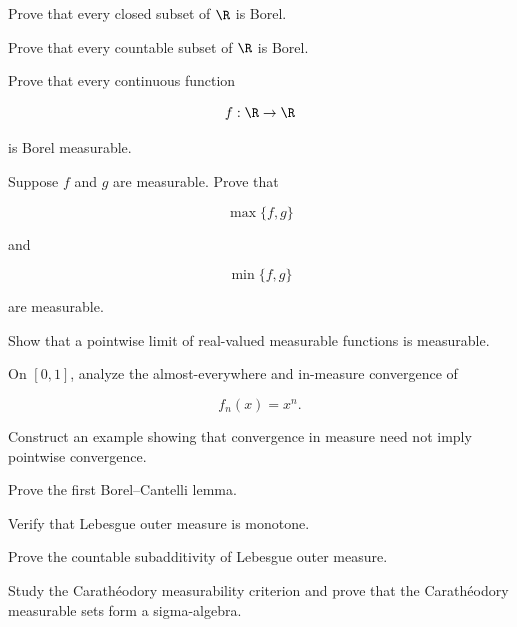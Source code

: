 \begin{exercise}[3]
Prove that every closed subset of \(\R\) is Borel.
\end{exercise}

\begin{exercise}[3]
Prove that every countable subset of \(\R\) is Borel.
\end{exercise}

\begin{exercise}[3]
Prove that every continuous function

\[
f:\R\to\R
\]

is Borel measurable.
\end{exercise}

\begin{exercise}[3]
Suppose \(f\) and \(g\) are measurable. Prove that

\[
\max\{f,g\}
\]

and

\[
\min\{f,g\}
\]

are measurable.
\end{exercise}

\begin{exercise}[3]
Show that a pointwise limit of real-valued measurable functions is
measurable.
\end{exercise}

\begin{exercise}[3]
On \([0,1]\), analyze the almost-everywhere and in-measure convergence of

\[
f_n(x)=x^n.
\]
\end{exercise}

\begin{exercise}[3]
Construct an example showing that convergence in measure need not imply
pointwise convergence.
\end{exercise}

\begin{exercise}[3]
Prove the first Borel--Cantelli lemma.
\end{exercise}

\begin{exercise}[4]
Verify that Lebesgue outer measure is monotone.
\end{exercise}

\begin{exercise}[4]
Prove the countable subadditivity of Lebesgue outer measure.
\end{exercise}

\begin{exercise}[4]
Study the Carath\'eodory measurability criterion and prove that the
Carath\'eodory measurable sets form a sigma-algebra.
\end{exercise}

